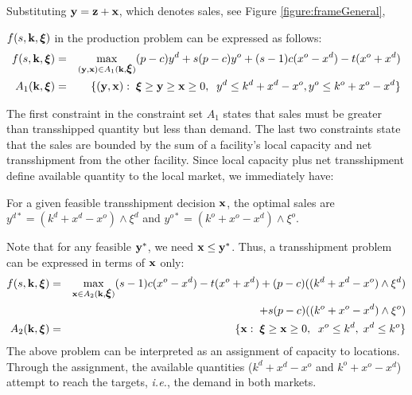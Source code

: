 \documentclass[mnsc,nonblindrev,copyedit]{informs2_wz} %
\newcommand{\xiv}{\mbox{\boldmath$\xi$}}
\begin{document}
Substituting $\bold y = \bold z+ \bold x$, which denotes sales, see Figure \ref{figure:frameGeneral},

 $f(s,\bold{k},\xiv)$ in{ the production problem} can be
expressed as follows:
\begin{eqnarray}
    f(s,\bold {k},\xiv) &=& \max_{(\bold{y,x}) \in A_1(\bold{k},\xiv)} (p-c)y^d + s(p-c)y^o + (s-1)c(x^o -x^d) %
    -t(x^o + x^d) \label{eqn:fSales}\\
    A_1(\bold{k},\xiv) &=& \{(\bold{y,x}):\; \xiv \geq \bold y \geq \bold x \geq 0, \; \; y^d \leq k^d+x^d -x^o, y^o \leq k^o+x^o-x^d\} \label{eqn:A1}
\end{eqnarray}

The first constraint in the constraint set $A_1$ states that sales must be greater than transshipped quantity but less than demand.  The last two constraints state that the sales are bounded by the sum of a facility's local capacity and net transshipment from the other facility.
Since local capacity plus net transshipment define available quantity to the local market, we immediately have:


{\lemma For a given feasible transshipment decision $\bold x$, the optimal sales are $y^{d*} =(k^d + x^d-x^o)\wedge \xi^d$ and $y^{o*} = (k^o+x^o-x^d)\wedge \xi^o$.
\label{lemma:baseSales}}

Note that for any feasible $\bold y^*$, we need $\bold x \leq \bold y^*$.  Thus, a transshipment problem can be expressed in terms of $\bold x$ only:
\begin{eqnarray}
    f(s,\bold {k},\xiv) &=& \max_{\bold{x} \in A_2(\bold{k},\xiv)} (s-1)c(x^o -x^d)-t(x^o + x^d)+ (p-c)((k^d + x^d-x^o)\wedge \xi^d) \nonumber\\
    && + s(p-c)((k^o+x^o-x^d)\wedge \xi^o)  \label{eqn:transship}\\
     A_2(\bold{k},\xiv) &=& \{\bold{x}:\;  \xiv \geq \bold x \geq 0, \;\; x^o  \leq k^d,\; x^d \leq k^o\} \label{eqn:A2}
\end{eqnarray}
The above problem can be interpreted as an assignment of capacity to locations.  Through the assignment, the available quantities ($k^d + x^d-x^o$ and $ k^o+x^o-x^d$) attempt to reach the targets, {\it i.e.}, the demand in both markets.
\end{document}
